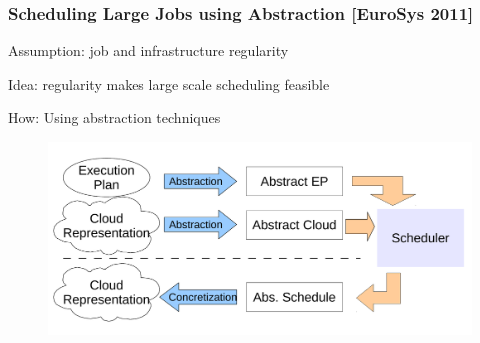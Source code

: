 \documentclass{beamer}
\begin{document}
\begin{frame}
  \frametitle{Scheduling Large Jobs using Abstraction [EuroSys 2011]}
  Assumption: job and infrastructure \alert{regularity} 

  \vspace{1ex}

  Idea: regularity makes large scale scheduling feasible

  \vspace{1ex}

  How: Using abstraction techniques
  \begin{figure}
    \includegraphics[scale=0.35]{abs_scheduling}
  \end{figure}
\end{frame}
\end{document}
